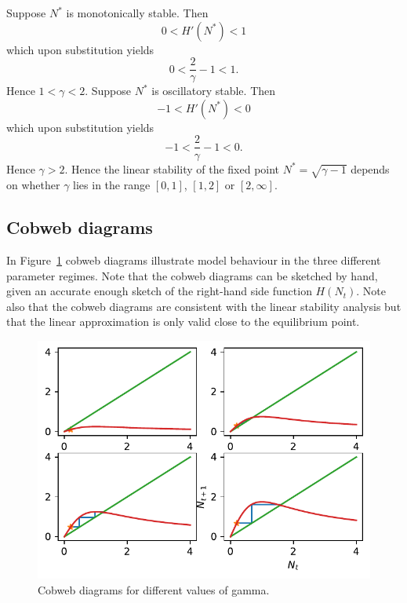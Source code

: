 \documentclass[
  letterpaper,
  DIV=11,
  numbers=noendperiod]{scrreprt}
\begin{document}
Suppose \(N^*\) is monotonically stable. Then \[
0<H'(N^*) <1 
\] which upon substitution yields \[
0<\frac{2}{\gamma}-1  <1. 
\] Hence \(1<\gamma<2\). Suppose \(N^*\) is oscillatory stable. Then \[
-1<H'(N^*) <0 
\] which upon substitution yields \[
-1<\frac{2}{\gamma}-1  < 0.
\] Hence \(\gamma>2\). Hence the linear stability of the fixed point
\(N^*=\sqrt{\gamma-1}\) depends on whether \(\gamma\) lies in the range
\([0,1]\), \([1,2 ]\) or \([2,\infty]\).

\hypertarget{cobweb-diagrams}{%
\subsection{Cobweb diagrams}\label{cobweb-diagrams}}

In Figure~\ref{fig-densmodelcobweb} cobweb diagrams illustrate model
behaviour in the three different parameter regimes. Note that the cobweb
diagrams can be sketched by hand, given an accurate enough sketch of the
right-hand side function \(H(N_t)\). Note also that the cobweb diagrams
are consistent with the linear stability analysis but that the linear
approximation is only valid close to the equilibrium point.

\begin{figure}

{\centering \includegraphics{MA32009-SinglePopDiscreteTimea_files/figure-pdf/fig-densmodelcobweb-output-1.pdf}

}

\caption{\label{fig-densmodelcobweb}Cobweb diagrams for different values
of gamma.}

\end{figure}
\end{document}
